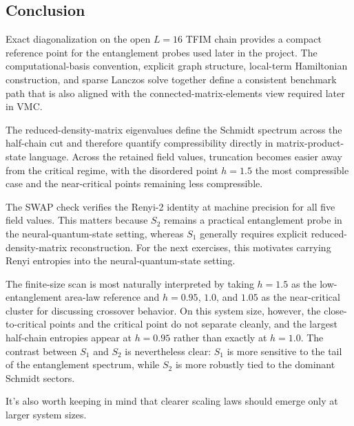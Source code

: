 \documentclass[11pt,a4paper]{article}
\begin{document}
    \subsection*{Conclusion}

    Exact diagonalization on the open $L=16$ TFIM chain provides a compact reference point for the entanglement probes used later in the project. The computational-basis convention, explicit graph structure, local-term Hamiltonian construction, and sparse Lanczos solve together define a consistent benchmark path that is also aligned with the connected-matrix-elements view required later in VMC.

    The reduced-density-matrix eigenvalues define the Schmidt spectrum across the half-chain cut and therefore quantify compressibility directly in matrix-product-state language. Across the retained field values, truncation becomes easier away from the critical regime, with the disordered point $h=1.5$ the most compressible case and the near-critical points remaining less compressible.

    The SWAP check verifies the Renyi-2 identity at machine precision for all five field values. This matters because $S_2$ remains a practical entanglement probe in the neural-quantum-state setting, whereas $S_1$ generally requires explicit reduced-density-matrix reconstruction. For the next exercises, this motivates carrying Renyi entropies into the neural-quantum-state setting.

    The finite-size scan is most naturally interpreted by taking $h=1.5$ as the low-entanglement area-law reference and $h=0.95$, $1.0$, and $1.05$ as the near-critical cluster for discussing crossover behavior. On this system size, however, the close-to-critical points and the critical point do not separate cleanly, and the largest half-chain entropies appear at $h=0.95$ rather than exactly at $h=1.0$. The contrast between $S_1$ and $S_2$ is nevertheless clear: $S_1$ is more sensitive to the tail of the entanglement spectrum, while $S_2$ is more robustly tied to the dominant Schmidt sectors.

    It's also worth keeping in mind that clearer scaling laws should emerge only at larger system sizes.
\end{document}
